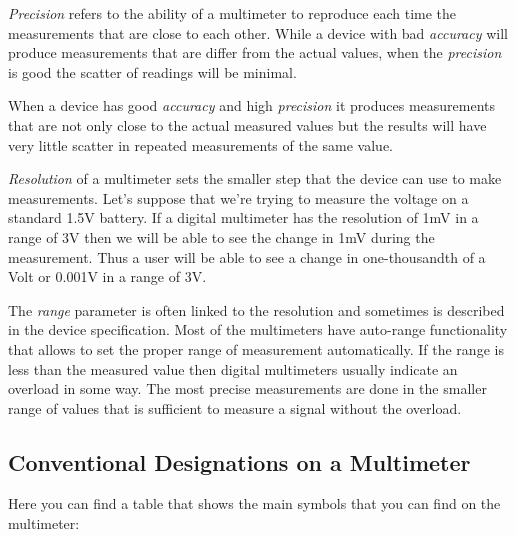 \documentclass[../main.tex]{subfiles}
\begin{document}
\emph{Precision} refers to the ability of a multimeter to reproduce each time
the measurements that are close to each other.  While a device with bad
\emph{accuracy} will produce measurements that are differ from the actual
values, when the \emph{precision} is good the scatter of readings will be
minimal.

When a device has good \emph{accuracy} and high \emph{precision} it produces
measurements that are not only close to the actual measured values but the
results will have very little scatter in repeated measurements of the same
value.

\emph{Resolution} of a multimeter sets the smaller step that the device can use
to make measurements.  Let's suppose that we're trying to measure the voltage on
a standard 1.5V battery.  If a digital multimeter has the resolution of 1mV in a
range of 3V then we will be able to see the change in 1mV during the
measurement.  Thus a user will be able to see a change in one-thousandth of a
Volt or 0.001V in a range of 3V.

The \emph{range} parameter is often linked to the resolution and sometimes is
described in the device specification.  Most of the multimeters have auto-range
functionality that allows to set the proper range of measurement automatically.
If the range is less than the measured value then digital multimeters usually
indicate an overload in some way.  The most precise measurements are done in the
smaller range of values that is sufficient to measure a signal without the
overload.

\subsection{Conventional Designations on a Multimeter}

Here you can find a table that shows the main symbols that you can find on the
multimeter:
\end{document}
